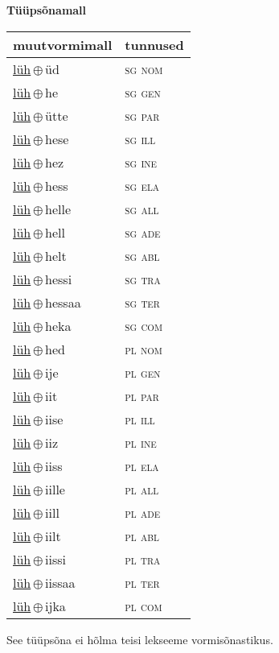 

\vspace{3.5em}
\noindent \begin{minipage}{\textwidth}
\noindent \textbf{Tüüpsõnamall \,}\\

\begin{sideways}
\begin{tabular}{l l}
muutvormimall & tunnused \\
\hline
\underline{lüh}\,$\oplus$\,üd & \textsc{ sg nom } \\
\underline{lüh}\,$\oplus$\,he & \textsc{ sg gen } \\
\underline{lüh}\,$\oplus$\,ütte & \textsc{ sg par } \\
\underline{lüh}\,$\oplus$\,hese & \textsc{ sg ill } \\
\underline{lüh}\,$\oplus$\,hez & \textsc{ sg ine } \\
\underline{lüh}\,$\oplus$\,hess & \textsc{ sg ela } \\
\underline{lüh}\,$\oplus$\,helle & \textsc{ sg all } \\
\underline{lüh}\,$\oplus$\,hell & \textsc{ sg ade } \\
\underline{lüh}\,$\oplus$\,helt & \textsc{ sg abl } \\
\underline{lüh}\,$\oplus$\,hessi & \textsc{ sg tra } \\
\underline{lüh}\,$\oplus$\,hessaa & \textsc{ sg ter } \\
\underline{lüh}\,$\oplus$\,heka & \textsc{ sg com } \\
\underline{lüh}\,$\oplus$\,hed & \textsc{ pl nom } \\
\underline{lüh}\,$\oplus$\,ije & \textsc{ pl gen } \\
\underline{lüh}\,$\oplus$\,iit & \textsc{ pl par } \\
\underline{lüh}\,$\oplus$\,iise & \textsc{ pl ill } \\
\underline{lüh}\,$\oplus$\,iiz & \textsc{ pl ine } \\
\underline{lüh}\,$\oplus$\,iiss & \textsc{ pl ela } \\
\underline{lüh}\,$\oplus$\,iille & \textsc{ pl all } \\
\underline{lüh}\,$\oplus$\,iill & \textsc{ pl ade } \\
\underline{lüh}\,$\oplus$\,iilt & \textsc{ pl abl } \\
\underline{lüh}\,$\oplus$\,iissi & \textsc{ pl tra } \\
\underline{lüh}\,$\oplus$\,iissaa & \textsc{ pl ter } \\
\underline{lüh}\,$\oplus$\,ijka & \textsc{ pl com } \\
\end{tabular}
\end{sideways}
\label{tab:tüüpsõnamall-lühüd}

\end{minipage}

 
\vspace{1em}
\noindent See tüüpsõna ei hõlma teisi lekseeme vormi\-sõnastikus.
